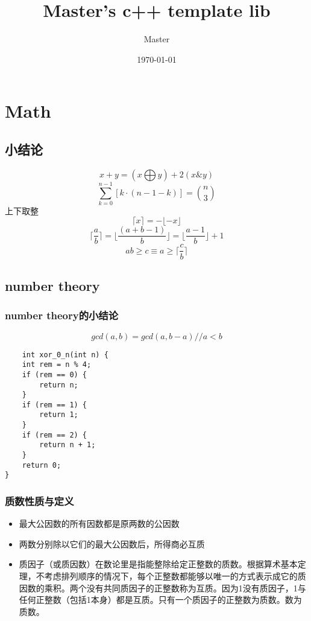 \documentclass[UTF8]{ctexart}
\title{Master's c++ template lib}
\author{Master}
\date{\today}
\begin{document}
\begin{titlepage}
    \maketitle
\end{titlepage}
\tableofcontents
\section{Math}
\subsection{小结论}
\[
x+y= ( x\bigoplus y ) + 2 ( x \& y )
\]
\[
\sum_{k=0}^{n-1} \left[ k \cdot (n-1-k) \right] = \binom{n}{3}
\]
上下取整
\[
\lceil x \rceil = - \lfloor - x \rfloor
\]
\[
\lceil \frac{a}{b} \rceil =\lfloor \frac{(a+b-1)}{b} \rfloor = \lfloor \frac{a-1}{b} \rfloor +1
\]
\[
ab\ge c \equiv a\ge \lceil \frac{c}{b} \rceil
\]
\subsection{number theory}
\subsubsection{number theory的小结论}
\[
gcd(a,b)=gcd(a,b-a)//a<b
\]
\begin{lstlisting}
    int xor_0_n(int n) {
    int rem = n % 4;
    if (rem == 0) {
        return n;
    }
    if (rem == 1) {
        return 1;
    }
    if (rem == 2) {
        return n + 1;
    }
    return 0;
}
\end{lstlisting}
\subsubsection{质数性质与定义}
\begin{itemize}
    \item 最大公因数的所有因数都是原两数的公因数
    \item 两数分别除以它们的最大公因数后，所得商必互质
    \item 质因子（或质因数）在数论里是指能整除给定正整数的质数。根据算术基本定理，不考虑排列顺序的情况下，每个正整数都能够以唯一的方式表示成它的质因数的乘积。两个没有共同质因子的正整数称为互质。因为1没有质因子，1与任何正整数（包括1本身）都是互质。只有一个质因子的正整数为质数。数为质数。
\end{itemize}
\end{document}
